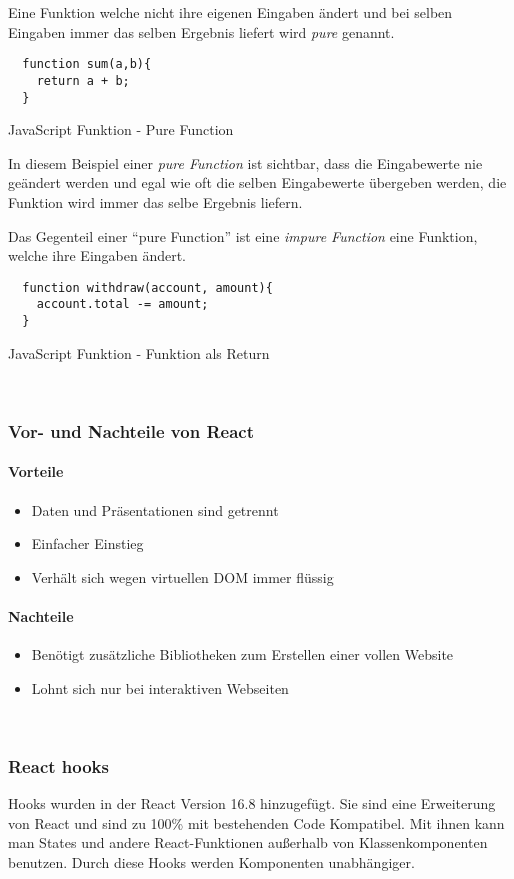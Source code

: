  Eine Funktion welche nicht ihre eigenen Eingaben ändert und bei selben Eingaben immer das selben 
 Ergebnis liefert wird \textit{pure} genannt.
\begin{code}[htp]
\begin{lstlisting}
  function sum(a,b){
    return a + b;
  }
\end{lstlisting}
\caption{JavaScript Funktion - Pure Function}
\end{code}
In diesem Beispiel einer \textit{pure Function} ist sichtbar, dass die Eingabewerte nie geändert werden und egal 
wie oft die selben Eingabewerte übergeben werden, die Funktion wird immer das selbe Ergebnis liefern.


Das Gegenteil einer ``pure Function'' ist eine \textit{impure Function} eine Funktion, welche ihre Eingaben ändert.
\begin{code}[htp]
\begin{lstlisting}
  function withdraw(account, amount){
    account.total -= amount;
  }
\end{lstlisting}
\caption{JavaScript Funktion - Funktion als Return}
\end{code}
~\cite{Props}
\subsubsection{Vor- und Nachteile von React}
\paragraph{Vorteile}
\begin{itemize}
	\item Daten und Präsentationen sind getrennt
	\item Einfacher Einstieg
	\item Verhält sich wegen virtuellen DOM immer flüssig
\end{itemize}
\paragraph{Nachteile}
\begin{itemize}
	\item Benötigt zusätzliche Bibliotheken zum Erstellen einer vollen Website
	\item Lohnt sich nur bei interaktiven Webseiten
\end{itemize}~\cite{ReactVor-undNachteile}

\subsubsection{React hooks}
Hooks wurden in der React Version 16.8 hinzugefügt. Sie sind eine Erweiterung von React und sind 
zu 100\% mit bestehenden Code Kompatibel. Mit ihnen kann man States und andere React-Funktionen außerhalb 
von Klassenkomponenten benutzen. Durch diese Hooks werden Komponenten unabhängiger. 


